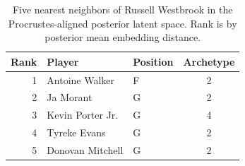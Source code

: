 \begin{table}[htbp]
  \centering\small
  \begin{tabular}{rllc}
    \toprule
    Rank & Player & Position & Archetype \\
    \midrule
    1 & Antoine Walker & F & 2 \\
    2 & Ja Morant & G & 2 \\
    3 & Kevin Porter Jr. & G & 4 \\
    4 & Tyreke Evans & G & 2 \\
    5 & Donovan Mitchell & G & 2 \\
    \bottomrule
  \end{tabular}
  \caption{Five nearest neighbors of Russell Westbrook in the Procrustes-aligned posterior latent space. Rank is by posterior mean embedding distance.}
  \label{tab:Russell_Westbrook_neighbors}
\end{table}


